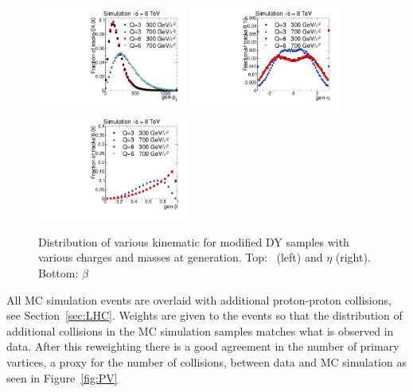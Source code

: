 \begin{figure}
 \begin{center}
  \includegraphics[clip=true, trim=0.0cm 0cm 1.4cm 0cm, width=0.44\textwidth]{figures/muonly/Selection_Comp_DY_genpT}
  \includegraphics[clip=true, trim=0.0cm 0cm 1.4cm 0cm, width=0.44\textwidth]{figures/muonly/Selection_Comp_DY_geneta}
  \includegraphics[clip=true, trim=0.0cm 0cm 1.4cm 0cm, width=0.44\textwidth]{figures/muonly/Selection_Comp_DY_genbeta}
 \end{center}
 \caption[Distribution of \pt, $\eta$, and $\beta$ for modified DY samples with various charges and masses at generation]
{Distribution of various kinematic for modified DY samples with various charges and masses at generation.
Top: \pt\ (left) and $\eta$ (right).
Bottom: $\beta$}
   \label{fig:GenDY}
\end{figure}

All MC simulation events are overlaid with additional proton-proton collisions, see Section~\ref{sec:LHC}.
Weights are given to the events so that the distribution of additional collisions in the MC simulation samples matches what is observed in data.
After this reweighting there is a good agreement in the number of primary vartices, a proxy for the number of collisions, between data and MC simulation as seen in Figure~\ref{fig:PV}

